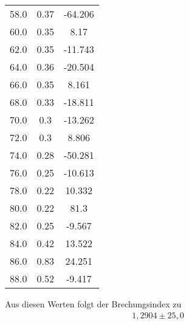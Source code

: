 \begin{table}[H]
\begin{tabular}{c c c}
        58.0  &  0.37  &  -64.206  \\
        60.0  &  0.35  &  8.17  \\
        62.0  &  0.35  &  -11.743  \\
        64.0  &  0.36  &  -20.504  \\
        66.0  &  0.35  &  8.161  \\
        68.0  &  0.33  &  -18.811  \\
        70.0  &  0.3  &  -13.262  \\
        72.0  &  0.3  &  8.806  \\
        74.0  &  0.28  &  -50.281  \\
        76.0  &  0.25  &  -10.613  \\
        78.0  &  0.22  &  10.332  \\
        80.0  &  0.22  &  81.3  \\
        82.0  &  0.25  &  -9.567  \\
        84.0  &  0.42  &  13.522  \\
        86.0  &  0.83  &  24.251  \\
        88.0  &  0.52  &  -9.417  \\
        \bottomrule
    \end{tabular}
\end{table}

\noindent
Aus diesen Werten folgt der Brechungsindex zu
\begin{align*}
    1,2904 \pm 25,0
\end{align*}
